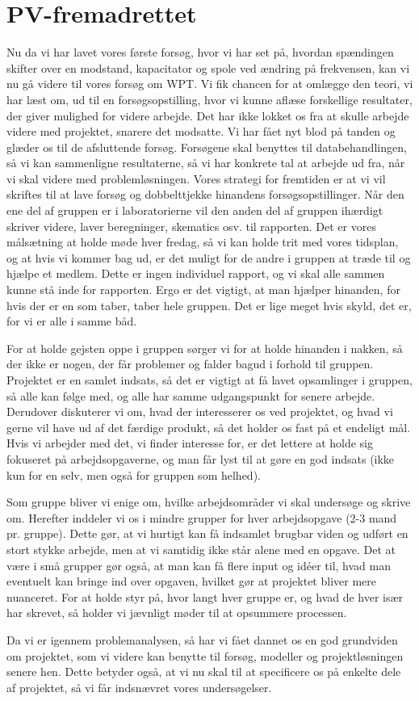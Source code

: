 \chapter{PV-fremadrettet}
Nu da vi har lavet vores første forsøg, hvor vi har set på, hvordan spændingen skifter over en modstand, kapacitator og spole ved ændring på frekvensen, kan vi nu gå videre til vores forsøg om WPT. Vi fik chancen for at omlægge den teori, vi har læst om, ud til en forsøgsopstilling, hvor vi kunne aflæse forskellige resultater, der giver mulighed for videre arbejde. Det har ikke lokket os fra at skulle arbejde videre med projektet, snarere det modsatte. Vi har fået nyt blod på tanden og glæder os til de afsluttende forsøg. Forsøgene skal benyttes til databehandlingen, så vi kan sammenligne resultaterne, så vi har konkrete tal at arbejde ud fra, når vi skal videre med problemløsningen. Vores strategi for fremtiden er at vi vil skriftes til at lave forsøg og dobbelttjekke hinandens forsøgsopstillinger. Når den ene del af gruppen er i laboratorierne vil den anden del af gruppen ihærdigt skriver videre, laver beregninger, skematics osv. til rapporten. Det er vores målsætning at holde møde hver fredag, så vi kan holde trit med vores tidsplan, og at hvis vi kommer bag ud, er det muligt for de andre i gruppen at træde til og hjælpe et medlem. Dette er ingen individuel rapport, og vi skal alle sammen kunne stå inde for rapporten. Ergo er det vigtigt, at man hjælper hinanden, for hvis der er en som taber, taber hele gruppen. Det er lige meget hvis skyld, det er, for vi er alle i samme båd.

For at holde gejsten oppe i gruppen sørger vi for at holde hinanden i nakken, så der ikke er nogen, der får problemer og falder bagud i forhold til gruppen. Projektet er en samlet indsats, så det er vigtigt at få lavet opsamlinger i gruppen, så alle kan følge med, og alle har samme udgangspunkt for senere arbejde. Derudover diskuterer vi om, hvad der interesserer os ved projektet, og hvad vi gerne vil have ud af det færdige produkt, så det holder os fast på et endeligt mål. Hvis vi arbejder med det, vi finder interesse for, er det lettere at holde sig fokuseret på arbejdsopgaverne, og man får lyst til at gøre en god indsats (ikke kun for en selv, men også for gruppen som helhed).

Som gruppe bliver vi enige om, hvilke arbejdsområder vi skal undersøge og skrive om. Herefter inddeler vi os i mindre grupper for hver arbejdsopgave (2-3 mand pr. gruppe). Dette gør, at vi hurtigt kan få indsamlet brugbar viden og udført en stort stykke arbejde, men at vi samtidig ikke står alene med en opgave. Det at være i små grupper gør også, at man kan få flere input og idéer til, hvad man eventuelt kan bringe ind over opgaven, hvilket gør at projektet bliver mere nuanceret. For at holde styr på, hvor langt hver gruppe er, og hvad de hver især har skrevet, så holder vi jævnligt møder til at opsummere processen.

Da vi er igennem problemanalysen, så har vi fået dannet os en god grundviden om projektet, som vi videre kan benytte til forsøg, modeller og projektløsningen senere hen. Dette betyder også, at vi nu skal til at specificere os på enkelte dele af projektet, så vi får indsnævret vores undersøgelser.
